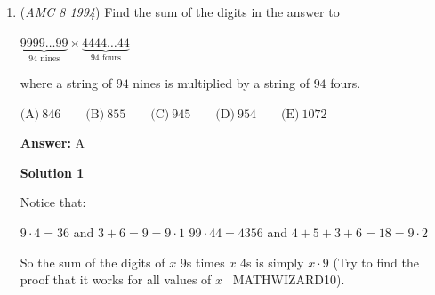 \begin{enumerate}
 
 \[1+1+2+1+1 = \boxed{\textbf{(B)}\ 6}\]




\textbf{Solution 2 (Generalization)}

Suppose the grid has $m$ rows and $n$ columns.

 Since a green square's top edge may not border a red square, each column, from top to bottom, must consist of $k$ green squares followed by $m-k$ red squares, where $k$ is an integer such that $0 \leq k \leq m$.  Also, since a green square's right edge may not border a red square, each column except the leftmost must contain at least as many green squares as the column directly to its left.  Any coloring satisfying these two constraints is valid.

 Notice that each valid coloring can be found by tracing a path from the top left corner to the bottom right corner using edges of the grid, coloring all squares above and to the right of the path green, and coloring all the squares to the right of the path red.

 There are $\binom{m+n}{n}$ paths through the grid, and thus there are also $\binom{m+n}{n}$ valid to color it.  So, there are $\binom{4}{2} = \boxed{\textbf{(B)}\ 6}$ valid ways to color a $2 \times 2$ grid.

 -j314andrews

 


	\item (\textit{AMC 8 1994}) Find the sum of the digits in the answer to


 
$\underbrace{9999\ldots 99}_{94\text{ nines}} \times \underbrace{4444\ldots 44}_{94\text{ fours}}$


 


 where a string of $94$ nines is multiplied by a string of $94$ fours.


 $\text{(A)}\ 846 \qquad \text{(B)}\ 855 \qquad \text{(C)}\ 945 \qquad \text{(D)}\ 954 \qquad \text{(E)}\ 1072$

 \textbf{Answer: }A



\textbf{Solution 1}

Notice that:

 $9 \cdot 4 = 36$ and $3+6 = 9 = 9 \cdot 1$
$99 \cdot 44 = 4356$ and $4+5+3+6 = 18 = 9 \cdot 2$

 So the sum of the digits of $x$ 9s times $x$ 4s is simply $x \cdot 9$ (Try to find the proof that it works for all values of $x$ ~MATHWIZARD10).


\end{enumerate}

